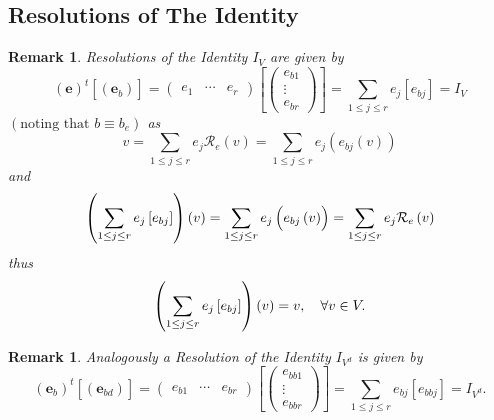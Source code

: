 \documentclass[aps,preprint]{revtex4}
\newtheorem{remark}[theorem]{Remark}
\begin{document}
\subsection{Resolutions of The Identity \label{Resolutions of The Identity}}

\begin{remark}
Resolutions of the Identity $I_{V}$ are given by 
\begin{equation}
\left( \overset{}{\boldsymbol{e}}\right) ^{t}\left[ \overset{}{\left( 
\boldsymbol{e}_{b}\right) }\right] =\left( 
\begin{array}{ccc}
e_{1} & \cdots & e_{r}%
\end{array}%
\right) \left[ \left( 
\begin{array}{c}
e_{b1} \\ 
\vdots \\ 
e_{br}%
\end{array}%
\right) \right] =\sum_{1\leq j\leq r}e_{j}\left[ e_{bj}\right] =I_{V}
\end{equation}%
$\left( \text{noting that }b\equiv b_{e}\right) $ as 
\begin{equation}
v=\sum_{1\leq j\leq r}e_{j}\mathcal{R}_{e}\left( v\right) =\sum_{1\leq j\leq
r}e_{j}\left( \overset{}{e_{bj}\left( v\right) }\right)
\end{equation}%
and 
\begin{equation}
\left( \sum_{1\leq j\leq r}e_{j}\left[ e_{bj}\right] \right) \left( \overset{%
}{v}\right) =\sum_{1\leq j\leq r}e_{j}\left( \overset{}{e_{bj}\left(
v\right) }\right) =\sum_{1\leq j\leq r}e_{j}\mathcal{R}_{e}\left( v\right)
\end{equation}%
thus 
\begin{equation}
\left( \sum_{1\leq j\leq r}e_{j}\left[ e_{bj}\right] \right) \left( \overset{%
}{v}\right) =v,\quad \forall v\in V.
\end{equation}
\end{remark}

\begin{remark}
Analogously a Resolution of the Identity $I_{V^{d}}$ is given by 
\begin{equation}
\left( \overset{}{\boldsymbol{e}_{b}}\right) ^{t}\left[ \overset{}{\left( 
\boldsymbol{e}_{bd}\right) }\right] =\left( 
\begin{array}{ccc}
e_{b1} & \cdots & e_{br}%
\end{array}%
\right) \left[ \left( 
\begin{array}{c}
e_{bb1} \\ 
\vdots \\ 
e_{bbr}%
\end{array}%
\right) \right] =\sum_{1\leq j\leq r}e_{bj}\left[ e_{bbj}\right] =I_{V^{d}}.
\end{equation}
\end{remark}
\end{document}
